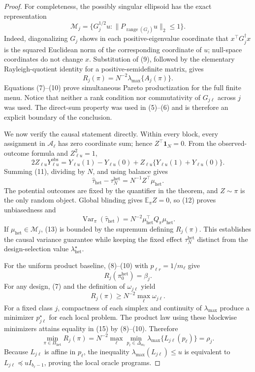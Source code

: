 \documentclass{article}
\begin{document}
\begin{proof}
For completeness, the possibly singular ellipsoid has the exact representation
\[
\mathcal M_j
=\{G_j^{1/2}u:\|P_{\operatorname{range}(G_j)}u\|_2\le1\}.
\tag{9}
\]
Indeed, diagonalizing \(G_j\) shows in each positive-eigenvalue coordinate that \(x^\top G_j^\dagger x\) is the squared Euclidean norm of the corresponding coordinate of \(u\); null-space coordinates do not change \(x\).  Substitution of (9), followed by the elementary Rayleigh-quotient identity for a positive-semidefinite matrix, gives
\[
R_j(\pi)=N^{-2}\lambda_{\max}\{A_j(\pi)\}.
\tag{10}
\]
Equations (7)--(10) prove simultaneous Pareto productization for the full finite menu.  Notice that neither a rank condition nor commutativity of \(G_{j\ell}\) across \(j\) was used.  The direct-sum property was used in (5)--(6) and is therefore an explicit boundary of the conclusion.

We now verify the causal statement directly.  Within every block, every assignment in \(\mathcal A_\ell\) has zero coordinate sum; hence \(Z^\top\mathbf1_N=0\).  From the observed-outcome formula and \(Z_{\ell u}^2=1\),
\[
2Z_{\ell u}Y_{\ell u}^{\mathrm{obs}}
=Y_{\ell u}(1)-Y_{\ell u}(0)
+Z_{\ell u}\{Y_{\ell u}(1)+Y_{\ell u}(0)\}.
\tag{11}
\]
Summing (11), dividing by \(N\), and using balance gives
\[
\widehat\tau_{\mathrm{het}}-\tau_N^{\mathrm{het}}
=N^{-1}Z^\top\mu_{\mathrm{het}}.
\tag{12}
\]
The potential outcomes are fixed by the quantifier in the theorem, and \(Z\sim\pi\) is the only random object.  Global blinding gives \(\mathbb E_\pi Z=0\), so (12) proves unbiasedness and
\[
\operatorname{Var}_\pi(\widehat\tau_{\mathrm{het}})
=N^{-2}\mu_{\mathrm{het}}^\top Q_\pi\mu_{\mathrm{het}}.
\tag{13}
\]
If \(\mu_{\mathrm{het}}\in\mathcal M_j\), (13) is bounded by the supremum defining \(R_j(\pi)\).  This establishes the causal variance guarantee while keeping the fixed effect \(\tau_N^{\mathrm{het}}\) distinct from the design-selection value \(\lambda_{\mathrm{het}}^\star\).

For the uniform product baseline, (8)--(10) with \(p_{\ell r}=1/m_\ell\) give
\[
R_j(\pi_0^{\mathrm{het}})=\beta_j.
\tag{14}
\]
For any design, (7) and the definition of \(\omega_{j\ell}\) yield
\[
R_j(\pi)\ge N^{-2}\max_\ell\omega_{j\ell}.
\tag{15}
\]
For a fixed class \(j\), compactness of each simplex and continuity of \(\lambda_{\max}\) produce a minimizer \(p_{j\ell}^\star\) for each local problem.  The product law using these blockwise minimizers attains equality in (15) by (8)--(10).  Therefore
\[
\min_{\pi\in\Pi_{\mathrm{het}}}R_j(\pi)
=N^{-2}\max_\ell\min_{p_\ell\in\Delta_{m_\ell}}
\lambda_{\max}\{L_{j\ell}(p_\ell)\}
=\rho_j.
\tag{16}
\]
Because \(L_{j\ell}\) is affine in \(p_\ell\), the inequality \(\lambda_{\max}(L_{j\ell})\le u\) is equivalent to \(L_{j\ell}\preceq uI_{b_\ell-1}\), proving the local oracle programs.


\end{proof}
\end{document}
